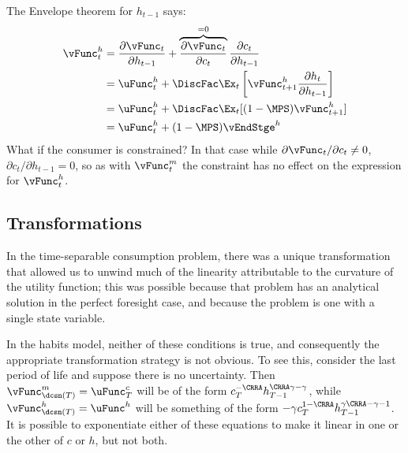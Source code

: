 \documentclass[\econtexRoot/SolvingMicroDSOPs]{subfiles}
\begin{document}
The Envelope theorem for $h_{t-1}$ says:
\begin{equation}\begin{gathered}\begin{aligned}
  {\vFunc}_{t}^{h}  & = \frac{\partial {\vFunc}_{t}}{\partial h_{t-1}} + \overbrace{\frac{\partial {\vFunc}_{t}}{\partial {c}_{t}}}^{=0}\frac{\partial {c}_{t}}{\partial h_{t-1}} \nonumber
  \\  & = \uFunc^{h}_{t} + \DiscFac \Ex_{t} \left[{\vFunc}_{t+1}^{h}\frac{\partial h_{t}}{\partial h_{t-1}} \right]\nonumber
  \\  & = \uFunc^{h}_{t} + \DiscFac \Ex_{t} [(1-\MPS) {\vFunc}_{t+1}^{h}] \nonumber
  \\  & = \uFunc^{h}_{t} + (1-\MPS) \vEndStge^{h} \label{eq:vhtformula}
\end{aligned}\end{gathered}\end{equation}
What if the consumer is constrained?  In that case while $\partial
{\vFunc}_{t}/\partial {c}_{t} \neq 0$, $\partial {c}_{t}/\partial h_{t-1} = 0$, so as
with ${\vFunc}_{t}^{m}$ the constraint has no effect on the expression for ${\vFunc}^{h}_{t}$.

\hypertarget{Transforamtions}{}
\subsection{Transformations}

In the time-separable consumption problem, there was a unique
transformation that allowed us to unwind much of the linearity
attributable to the curvature of the utility function; this was
possible because that problem has an analytical solution in the
perfect foresight case, and because the problem is one with a single
state variable.

In the habits model, neither of these conditions is true, and
consequently the appropriate transformation strategy is not obvious.
To see this, consider the last period of life and suppose there is no
uncertainty.  Then ${\vFunc}_{\dcsn(T)}^{m} = \uFunc_{T}^{c}$ will be of the form
${c}_{T}^{-\CRRA}h_{T-1}^{\CRRA \gamma - \gamma}$, while ${\vFunc}_{\dcsn(T)}^{h} =
\uFunc^{h}$ will be something of the form $-\gamma
{c}_{T}^{1-\CRRA}h_{T-1}^{\gamma\CRRA-\gamma-1}$.  It is possible to
exponentiate either of these equations to make it linear in one or the
other of ${c}$ or $h$, but not both.
\end{document}
